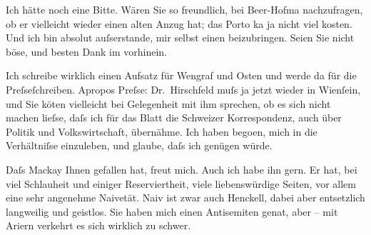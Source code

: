 \pstart
           Ich hätte noch eine Bitte. Wären Sie so freundlich, bei Beer-Hofma{\geminationn} nachzufragen, ob er vielleicht wieder einen {\pb}alten Anzug hat; das Porto ka{\geminationn} ja nicht viel kosten.
               Und ich bin absolut auſserstande, mir selbst einen beizubringen. Seien Sie nicht
               böse, und besten Dank im vorhinein.\pend
           
\pstart
           Ich schreibe wirklich einen Aufsatz für Wengraf und Osten und werde da{\geminationn}{ }\label{K_L00499-1v}\label{K_L00499-1} für die Preſseſchreiben. Apropos Preſse: Dr. Hirschfeld muſs ja jetzt
               wieder in Wienſein, und Sie kö{\geminationn}ten
               vielleicht bei Gelegenheit mit ihm sprechen, ob es sich nicht machen lieſse, daſs ich
               für das Blatt die Schweizer Korrespondenz, auch
               über Politik und Volkswirtschaft, übernähme. Ich haben bego{\geminationn}en, mich in die Verhältniſse einzuleben, und glaube,
               daſs ich genügen würde.\pend
           
\pstart
           Daſs Mackay Ihnen gefallen hat, freut mich.
               Auch ich habe ihn gern. Er hat, bei viel Schlauheit und einiger Reserviertheit, viele
               liebenswürdige Seiten, vor allem eine sehr angenehme Naivetät. Naiv ist zwar auch Henckell, dabei aber entsetzlich langweilig und
               geistlos. Sie haben mich einen Antisemiten gena{\geminationn}t, aber
               – mit Ariern verkehrt es sich wirklich zu schwer.\pend
           
